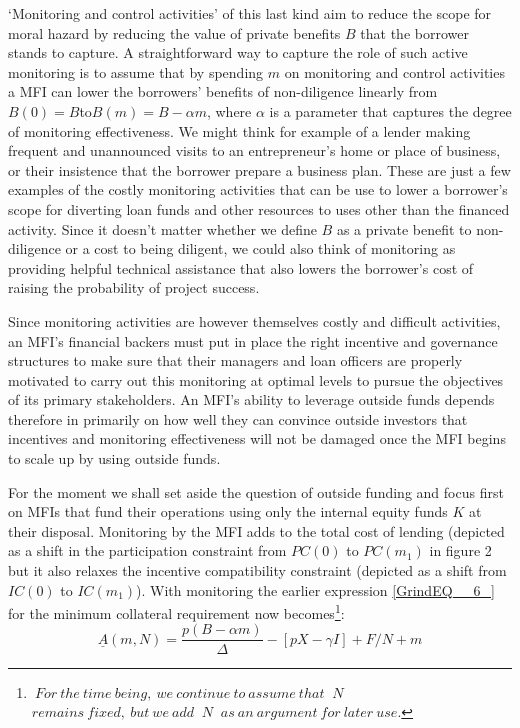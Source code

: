 \documentclass{article} %
\begin{document}
`Monitoring and control activities' of this last kind aim to reduce the scope for moral hazard by reducing the value of private benefits $B$ that the borrower stands to capture.  A straightforward way to capture the role of such active monitoring is to assume that by spending $m$ on monitoring and control activities a MFI can lower the borrowers' benefits of non-diligence linearly from $B(0)=B$to$B(m)=B-\alpha m$, where $\alpha $ is a parameter that captures the degree of monitoring effectiveness.  We might think for example of a lender making frequent and unannounced visits to an entrepreneur's home or place of business, or their insistence that the borrower prepare a business plan.  These are just a few examples of the costly monitoring activities that can be use to lower a borrower's scope for diverting loan funds and other resources to uses other than the financed activity.  Since it doesn't matter whether we define $B$ as a private benefit to non-diligence or a cost to being diligent, we could also think of monitoring as providing helpful technical assistance that also lowers the borrower's cost of raising the probability of project success. 

Since monitoring activities are however themselves costly and difficult activities, an MFI's financial backers must put in place the right incentive and governance structures to make sure that their managers and loan officers are properly motivated to carry out this monitoring at optimal levels to pursue the objectives of its primary stakeholders.  An MFI's ability to leverage outside funds depends therefore in primarily on how well they can convince outside investors that incentives and monitoring effectiveness will not be damaged once the MFI begins to scale up by using outside funds. 

For the moment we shall set aside the question of outside funding and focus first on MFIs that fund their operations using only the internal equity funds $K$ at their disposal. Monitoring by the MFI adds to the total cost of lending (depicted as a shift in the participation constraint from $PC(0)$ to $PC(m_{1} )$ in figure 2 but it also relaxes the incentive compatibility constraint (depicted as a shift from $IC(0)$ to $IC(m_{1} )$).  With monitoring the earlier expression \eqref{GrindEQ__6_} for the minimum collateral requirement now becomes\footnote{ $\ For\ the\ time\ being,\ we\ continue\ to\ assume\ that\ $  $N\ $  $remains\ fixed,\ but\ we\ add\ $  $N\ $  $as\ an\ argument\ for\ later\ use.$ }: 
\begin{equation} \label{ZEqnNum227544} 
\underline{A}(m,N)=\frac{p(B-\alpha m)}{\Delta } -\left[pX-\gamma I\right]+F/N+m 
\end{equation} 
\end{document}
